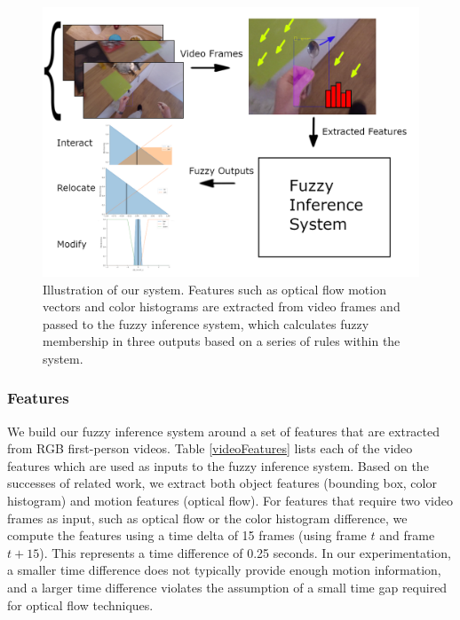 \documentclass[12pt]{report}
\begin{document}
\begin{figure}[t]
\centerline{\includegraphics[width=.9\linewidth]{figure/diagram.png}}
\caption{Illustration of our system. Features such as optical flow motion vectors and color histograms are extracted from video frames and passed to the fuzzy inference system, which calculates fuzzy membership in three outputs based on a series of rules within the system.}
\label{diagram}
\end{figure}

\subsubsection{Features}
We build our fuzzy inference system around a set of features that are extracted from RGB first-person videos. Table \ref{videoFeatures} lists each of the video features which are used as inputs to the fuzzy inference system. Based on the successes of related work, we extract both object features (bounding box, color histogram) and motion features (optical flow). For features that require two video frames as input, such as optical flow or the color histogram difference, we compute the features using a time delta of 15 frames (using frame $t$ and frame $t+15$). This represents a time difference of 0.25 seconds. In our experimentation, a smaller time difference does not typically provide enough motion information, and a larger time difference violates the assumption of a small time gap required for optical flow techniques.
\end{document}

